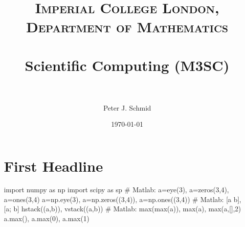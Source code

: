 \documentclass[paper=a4, fontsize=12pt]{scrartcl} %
\title{
\normalfont \normalsize
\textsc{Imperial College London, Department of Mathematics} \\ [25pt]
\horrule{0.5pt} \\[0.4cm]                      %
\huge Scientific Computing (M3SC) \\           %
\horrule{2pt} \\[0.5cm]                        %
}
\author{Peter J. Schmid}
\date{\normalsize\today}
\numberwithin{equation}{section}       %
\numberwithin{figure}{section}         %
\numberwithin{table}{section}          %
\begin{document}

\maketitle

\section{First Headline}

\begin{python}
  import numpy as np
  import scipy as sp
  # Matlab: a=eye(3), a=zeros(3,4), a=ones(3,4)
  a=np.eye(3), a=np.zeros((3,4)), a=np.ones((3,4))
  # Matlab: [a b], [a; b]
  hstack((a,b)), vstack((a,b))
  # Matlab: max(max(a)), max(a), max(a,[],2)
  a.max(), a.max(0), a.max(1)
\end{python}
\end{document}

